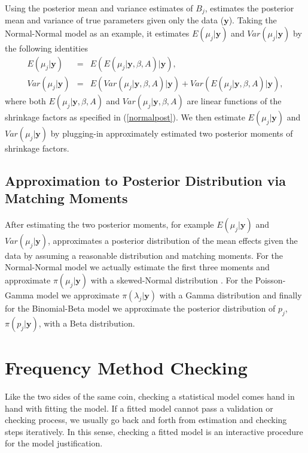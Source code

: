 \documentclass[article]{jss}
\begin{document}
Using the posterior mean and variance estimates of $B_{j}$,  estimates the posterior mean and variance of true parameters given only the data ($\textbf{y}$). Taking the Normal-Normal model as an example, it estimates $E(\mu_{j}\vert \textbf{y})$ and $Var(\mu_{j}\vert \textbf{y})$ by the following identities
\begin{eqnarray}
E(\mu_{j}\vert \textbf{y}) & = & E(E(\mu_{j}\vert \textbf{y}, \beta, A)\vert \textbf{y}), \\
Var(\mu_{j}\vert \textbf{y}) & = & E(Var(\mu_{j}\vert \textbf{y}, \beta, A)\vert \textbf{y})+Var(E(\mu_{j}\vert \textbf{y}, \beta, A)\vert \textbf{y}),
\end{eqnarray}  
where both $E(\mu_{j}\vert \textbf{y}, \beta, A)$ and $Var(\mu_{j}\vert \textbf{y}, \beta, A)$ are linear functions of the shrinkage factors as specified in (\ref{normalpost}). We then estimate $E(\mu_{j}\vert \textbf{y})$ and $Var(\mu_{j}\vert \textbf{y})$ by plugging-in approximately estimated two posterior moments of shrinkage factors.

\subsection[Approximation to Posterior Distribution by Moment Matching]{Approximation to Posterior Distribution via Matching Moments}
After estimating the two posterior moments, for example $E(\mu_{j}\vert \textbf{y})$ and $Var(\mu_{j}\vert \textbf{y})$,  approximates a posterior distribution of the mean effects given the data by assuming a reasonable distribution and matching moments. For the Normal-Normal model we actually estimate the first three moments and approximate $\pi(\mu_{j}\vert \textbf{y})$ with a skewed-Normal distribution \citep{sn2013}. For the Poisson-Gamma model we approximate $\pi(\lambda_{j}\vert \textbf{y})$ with a Gamma distribution and finally for the Binomial-Beta model we approximate the posterior distribution of $p_{j}$, $\pi(p_{j}\vert \textbf{y})$, with a Beta distribution.


\section[Frequency Method Checking]{Frequency Method Checking}
Like the two sides of the same coin, checking a statistical model comes hand in hand with fitting the model. If a fitted model cannot pass a validation or checking process, we usually go back and forth from estimation and checking steps iteratively. In this sense, checking a fitted model is an interactive procedure for the model justification.
\end{document}
